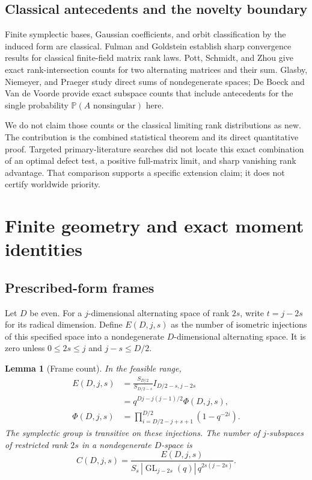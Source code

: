 \documentclass[11pt]{article}
\newtheorem{lemma}[theorem]{Lemma}
\theoremstyle{definition}\newtheorem{definition}[theorem]{Definition}
\theoremstyle{remark}\newtheorem{remark}[theorem]{Remark}
\newcommand{\Prob}{\mathbb P}
\newcommand{\GL}{\operatorname{GL}}
\newcommand{\1}{\mathbf 1}
\begin{document}
\subsection{Classical antecedents and the novelty boundary}
Finite symplectic bases, Gaussian coefficients, and orbit classification by
the induced form are classical. Fulman and Goldstein \cite{FG} establish
sharp convergence results for classical finite-field matrix rank laws.
Pott, Schmidt, and Zhou \cite{PSZ} give exact rank-intersection counts for
two alternating matrices and their sum. Glasby, Niemeyer, and Praeger
\cite{GNP} study direct sums of nondegenerate spaces; De Boeck and Van de
Voorde \cite{DBV} provide exact subspace counts that include antecedents
for the single probability $\Prob(A\text{ nonsingular})$ here.

We do not claim those counts or the classical limiting rank distributions
as new. The contribution is the combined statistical theorem and its direct
quantitative proof. Targeted primary-literature searches did not locate
this exact combination of an optimal defect test, a positive full-matrix
limit, and sharp vanishing rank advantage. That comparison supports a
specific extension claim; it does not certify worldwide priority.

\section{Finite geometry and exact moment identities}\label{sec:counts}

\subsection{Prescribed-form frames}
Let $D$ be even. For a $j$-dimensional alternating space of rank $2s$, write
$t=j-2s$ for its radical dimension. Define $E(D,j,s)$ as the number of
isometric injections of this specified space into a nondegenerate
$D$-dimensional alternating space. It is zero unless
$0\le2s\le j$ and $j-s\le D/2$.

\begin{lemma}[Frame count]\label{lem:frames}
In the feasible range,
\begin{align}
 E(D,j,s)&=\frac{S_{D/2}}{S_{D/2-s}} I_{D/2-s,j-2s}\label{eq:Ecount}\\
 &=q^{Dj-j(j-1)/2}\Phi(D,j,s),\label{eq:Ephi}\\
 \Phi(D,j,s)&=\prod_{i=D/2-j+s+1}^{D/2}(1-q^{-2i}).\label{eq:Phi}
\end{align}
The symplectic group is transitive on these injections. The number of
$j$-subspaces of restricted rank $2s$ in a nondegenerate $D$-space is
\begin{equation}\label{eq:C}
 C(D,j,s)=\frac{E(D,j,s)}{S_s\,|\GL_{j-2s}(q)|\,q^{2s(j-2s)}}.
\end{equation}
\end{lemma}
\end{document}

